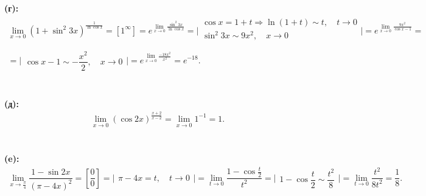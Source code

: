 \\
\\
\textbf{(г):}
$$
\begin{array}{l}
\lim\limits_{x\to0}(1+\sin^2{3x})^{\frac{1}{\ln{\cos{x}}}} = 
\left[1^{\infty}\right] = 
e^{\lim\limits_{x\to 0}\frac{\sin^2{3x}}{\ln{\cos{x}}}} =
\biggl| 
\begin{array}{l}
	\cos{x} = 1 + t \Rightarrow \ln{(1+t)} \sim t, \quad t \to 0 \\
	\sin^2{3x} \sim 9x^2,\quad x \to 0 \\	
\end{array}
\biggr|
= e^{\lim\limits_{x\to0}\frac{9x^2}{\cos{x}-1}} = \\ [14pt]
= \biggl| 
\begin{array}{l}
	\cos{x}-1 \sim -\dfrac{x^2}{2}, \quad x \to 0
\end{array}
\biggr|
= e^{\lim\limits_{x\to 0}\frac{-18x^2}{x^2}}
= e^{-18}.
\end{array}
$$
\\
\\
\textbf{(д):}
$$
\begin{array}{l}
	\lim\limits_{x\to0}(\cos{2x})^{\frac{x+2}{x-2}} =
	\lim\limits_{x\to0}1^{-1} = 1.	
\end{array}
$$
\\
\\
\textbf{(e):}
$$
\begin{array}{l}
	\lim\limits_{x\to\frac{\pi}{4}}\dfrac{1-\sin{2x}}{(\pi-4x)^2} = 
	\left[\dfrac{0}{0}\right] = 
	\biggl|
	\begin{array}{l}	
		\pi - 4x = t, \quad t \to 0		
	\end{array}
    \biggr|
    =\lim\limits_{t\to0}\dfrac{1-\cos{\frac{t}{2}}}{t^2} 
    = \biggl| \begin{array}{l}
    	1 - \cos{\dfrac{t}{2}} \sim \dfrac{t^2}{8}
      \end{array} \biggr|
    =\lim\limits_{t\to0}\dfrac{t^2}{8t^2}
    =\dfrac{1}{8}.  	
\end{array}
$$
\newpage

